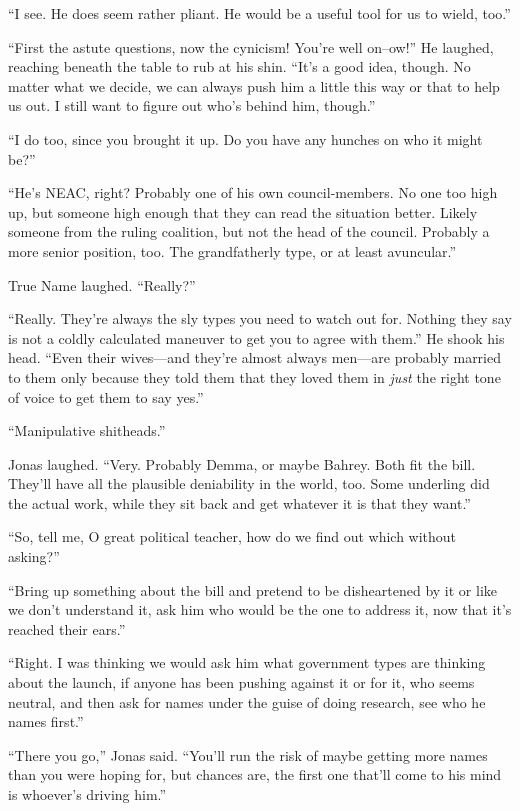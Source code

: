 ``I see. He does seem rather pliant. He would be a useful tool for us to wield, too.''

``First the astute questions, now the cynicism! You're well on--ow!'' He laughed, reaching beneath the table to rub at his shin. ``It's a good idea, though. No matter what we decide, we can always push him a little this way or that to help us out. I still want to figure out who's behind him, though.''

``I do too, since you brought it up. Do you have any hunches on who it might be?''

``He's NEAC, right? Probably one of his own council-members. No one too high up, but someone high enough that they can read the situation better. Likely someone from the ruling coalition, but not the head of the council. Probably a more senior position, too. The grandfatherly type, or at least avuncular.''

True Name laughed. ``Really?''

``Really. They're always the sly types you need to watch out for. Nothing they say is not a coldly calculated maneuver to get you to agree with them.'' He shook his head. ``Even their wives---and they're almost always men---are probably married to them only because they told them that they loved them in \emph{just} the right tone of voice to get them to say yes.''

``Manipulative shitheads.''

Jonas laughed. ``Very. Probably Demma, or maybe Bahrey. Both fit the bill. They'll have all the plausible deniability in the world, too. Some underling did the actual work, while they sit back and get whatever it is that they want.''

``So, tell me, O great political teacher, how do we find out which without asking?''

``Bring up something about the bill and pretend to be disheartened by it or like we don't understand it, ask him who would be the one to address it, now that it's reached their ears.''

``Right. I was thinking we would ask him what government types are thinking about the launch, if anyone has been pushing against it or for it, who seems neutral, and then ask for names under the guise of doing research, see who he names first.''

``There you go,'' Jonas said. ``You'll run the risk of maybe getting more names than you were hoping for, but chances are, the first one that'll come to his mind is whoever's driving him.''

